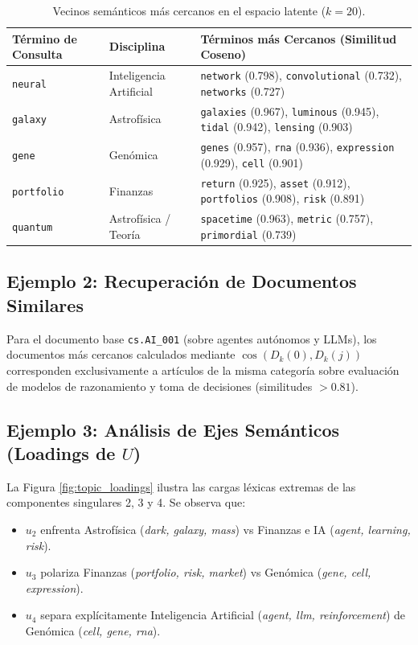 \documentclass[11pt,a4paper]{article}
\begin{document}
\begin{table}[H]
\centering
\caption{Vecinos semánticos más cercanos en el espacio latente ($k=20$).}
\label{tab:semantic_neighbors}
\begin{tabular}{lll}
\toprule
\textbf{Término de Consulta} & \textbf{Disciplina} & \textbf{Términos más Cercanos (Similitud Coseno)} \\
\midrule
\texttt{neural} & Inteligencia Artificial & \texttt{network} (0.798), \texttt{convolutional} (0.732), \texttt{networks} (0.727) \\
\texttt{galaxy} & Astrofísica & \texttt{galaxies} (0.967), \texttt{luminous} (0.945), \texttt{tidal} (0.942), \texttt{lensing} (0.903) \\
\texttt{gene} & Genómica & \texttt{genes} (0.957), \texttt{rna} (0.936), \texttt{expression} (0.929), \texttt{cell} (0.901) \\
\texttt{portfolio} & Finanzas & \texttt{return} (0.925), \texttt{asset} (0.912), \texttt{portfolios} (0.908), \texttt{risk} (0.891) \\
\texttt{quantum} & Astrofísica / Teoría & \texttt{spacetime} (0.963), \texttt{metric} (0.757), \texttt{primordial} (0.739) \\
\bottomrule
\end{tabular}
\end{table}

\subsection{Ejemplo 2: Recuperación de Documentos Similares}
Para el documento base \texttt{cs.AI\_001} (sobre agentes autónomos y LLMs), los documentos más cercanos calculados mediante $\cos(D_k(0), D_k(j))$ corresponden exclusivamente a artículos de la misma categoría sobre evaluación de modelos de razonamiento y toma de decisiones (similitudes $> 0.81$).

\subsection{Ejemplo 3: Análisis de Ejes Semánticos (Loadings de $U$)}
La Figura \ref{fig:topic_loadings} ilustra las cargas léxicas extremas de las componentes singulares 2, 3 y 4. Se observa que:
\begin{itemize}
    \item $u_2$ enfrenta Astrofísica (\textit{dark, galaxy, mass}) vs Finanzas e IA (\textit{agent, learning, risk}).
    \item $u_3$ polariza Finanzas (\textit{portfolio, risk, market}) vs Genómica (\textit{gene, cell, expression}).
    \item $u_4$ separa explícitamente Inteligencia Artificial (\textit{agent, llm, reinforcement}) de Genómica (\textit{cell, gene, rna}).
\end{itemize}
\end{document}
